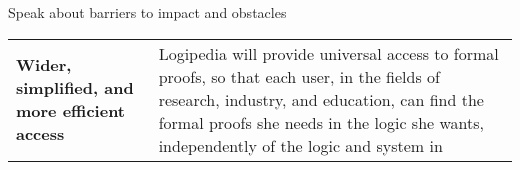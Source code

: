 {\color{red} Speak about barriers to impact and obstacles}

\begin{longtable}{|p{}|p{}|}
\hline
{\bf Wider, simplified, and more efficient access}&

Logipedia will provide universal access to formal proofs, so that each
user, in the fields of research, industry, and education, can find the formal proofs
she needs in the logic she wants, independently of the logic and system in

\end{longtable}
